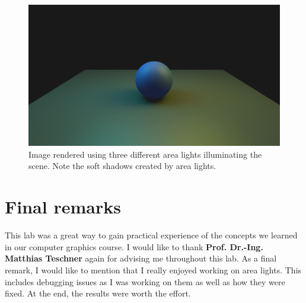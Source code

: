 \documentclass[11pt,a4paper]{article}
\begin{document}
	 \begin{figure}[H]
	 	\centering
	 	\captionsetup{justification=centering}
	 	\includegraphics[width=.5\textwidth]{arealight7}\quad
	 	\caption{Image rendered using three different area lights illuminating the scene. Note the soft shadows created by area lights.}
	 \end{figure}
 
 	\section{Final remarks}
 	This lab was a great way to gain practical experience of the concepts we learned in our computer graphics course. I would like to thank \textbf{Prof. Dr.-Ing. Matthias Teschner} again for advising me throughout this lab. As a final remark, I would like to mention that I really enjoyed working on area lights. This includes debugging issues as I was working on them as well as how they were fixed. At the end, the results were worth the effort.

	
	
	
\end{document}
